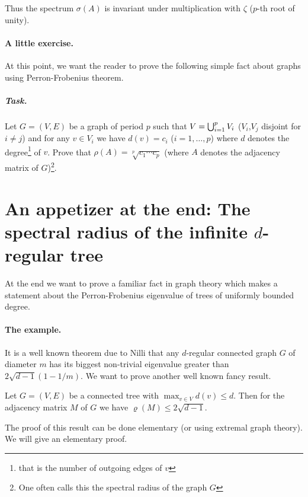 \documentclass{article}
\begin{document}
\begin{remark}
Thus the spectrum $\sigma(A)$ is invariant under multiplication with $\zeta$ ($p$-th root of unity).
\end{remark}

\paragraph{A little exercise.} At this point, we want the reader to prove the following simple fact about graphs using Perron-Frobenius theorem.

\subparagraph{Task.} Let $G=(V,E)$ be a graph of period $p$ such that $V=\bigcup_{i=1}^p{V_i}$ ($V_i$,$V_j$ disjoint for $i\neq j$) and for any $v\in V_i$ we have $d(v)=c_i$ ($i=1,\ldots,p$) where $d$ denotes the degree\footnote{that is the number of outgoing edges of $v$} of $v$. Prove that $\rho(A)=\sqrt[p]{c_1\cdots c_p}$ (where $A$ denotes the adjacency matrix of $G$)\footnote{One often calls this the spectral radius of the graph $G$}.

\section{An appetizer at the end: The spectral radius of the infinite $d$-regular tree}

At the end we want to prove a familiar fact in graph theory which makes a statement about the Perron-Frobenius eigenvalue of trees of uniformly bounded degree. 

\paragraph{The example.} It is a well known theorem due to Nilli that any $d$-regular connected graph $G$ of diameter $m$ has its biggest non-trivial eigenvalue greater than $2\sqrt{d-1}(1-1/m)$. We want to prove another well known fancy result.

\begin{lemma}
Let $G=(V,E)$ be a connected tree with $\max_{v\in V} d(v)\leq d$. Then for the adjacency matrix $M$ of $G$ we have $\varrho(M)\leq 2\sqrt{d-1}$. 
\end{lemma}

The proof of this result can be done elementary (or using extremal graph theory). 
We will give an elementary proof.
\end{document}
